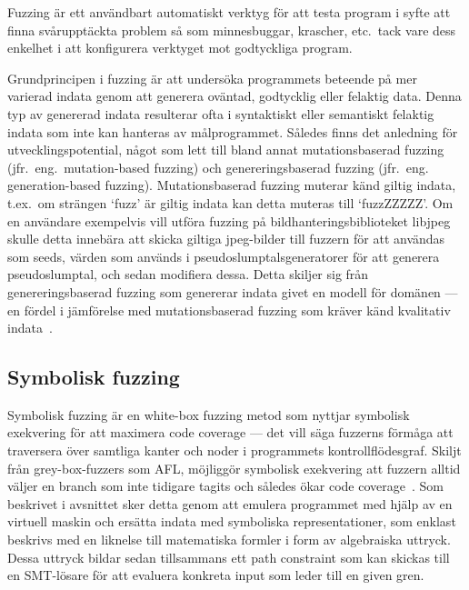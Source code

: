 Fuzzing är ett användbart automatiskt verktyg för att testa program i syfte att finna
svårupptäckta problem så som minnesbuggar, krascher, etc.\ tack vare dess enkelhet i
att konfigurera verktyget mot godtyckliga program.

Grundprincipen i fuzzing är att undersöka programmets beteende på mer varierad
indata genom att generera oväntad, godtycklig eller felaktig data. Denna typ av
genererad indata resulterar ofta i syntaktiskt eller semantiskt felaktig indata
som inte kan hanteras av målprogrammet. Således finns det anledning för
utvecklingspotential, något som lett till bland annat mutationsbaserad fuzzing
(jfr.\ eng.\ mutation-based fuzzing) och genereringsbaserad fuzzing (jfr.\ eng.
generation-based fuzzing). Mutationsbaserad fuzzing muterar känd giltig indata,
t.ex.\ om strängen `fuzz' är giltig indata kan detta muteras till `fuzzZZZZZ'. Om
en användare exempelvis vill utföra fuzzing på bildhanteringsbiblioteket libjpeg skulle
detta innebära att skicka giltiga jpeg-bilder till fuzzern för att användas som
seeds, värden som används i pseudoslumptalsgeneratorer för att generera
pseudoslumptal, och sedan modifiera dessa. Detta skiljer sig från
genereringsbaserad fuzzing som genererar indata givet en modell för domänen ---
en fördel i jämförelse med mutationsbaserad fuzzing som kräver känd kvalitativ
indata~\cite{fuzzing}.

\subsection{Symbolisk fuzzing} Symbolisk fuzzing är en white-box fuzzing metod
som nyttjar symbolisk exekvering för att maximera code coverage --- det vill säga fuzzerns
förmåga att traversera över samtliga kanter och noder i programmets kontrollflödesgraf.
Skiljt från grey-box-fuzzers som AFL, möjliggör symbolisk exekvering att fuzzern alltid
väljer en branch som inte tidigare tagits och således ökar code coverage~\cite{challenges_fuzzing}.
Som beskrivet i avsnittet  sker detta genom att
emulera programmet med hjälp av en virtuell maskin och ersätta indata med symboliska representationer,
som enklast beskrivs med en liknelse till matematiska formler i form av algebraiska uttryck.
Dessa uttryck bildar sedan tillsammans ett path constraint som kan skickas till en SMT-lösare för
att evaluera konkreta input som leder till en given gren.

